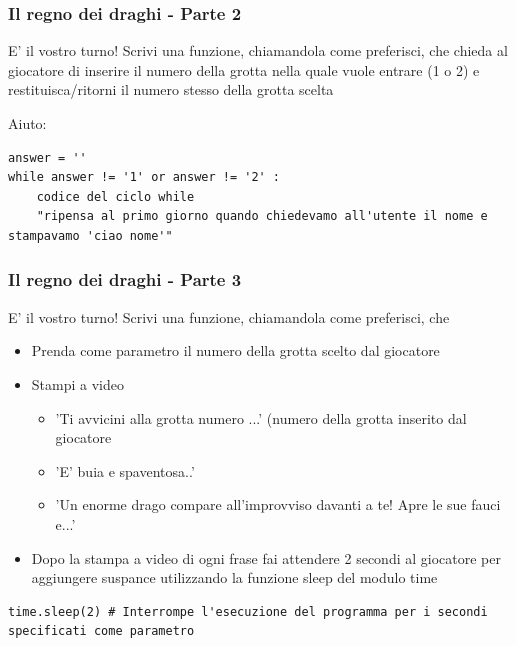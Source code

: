 \documentclass{beamer}
\begin{document}
\begin{frame}[fragile]
\frametitle{Il regno dei draghi - Parte 2}

\begin{block}{E' il vostro turno!}
Scrivi una funzione, chiamandola come preferisci, che chieda al giocatore di inserire il numero della grotta nella quale vuole entrare (1 o 2) e restituisca/ritorni il numero stesso della grotta scelta 

Aiuto:
\end{block}

    \begin{lstlisting}
answer = ''
while answer != '1' or answer != '2' :
    codice del ciclo while
    "ripensa al primo giorno quando chiedevamo all'utente il nome e stampavamo 'ciao nome'"
    \end{lstlisting}
\end{frame}

\begin{frame}[fragile]
\frametitle{Il regno dei draghi - Parte 3}

\begin{block}{E' il vostro turno!}
Scrivi una funzione, chiamandola come preferisci, che
    \begin{itemize}
        \item Prenda come parametro il numero della grotta scelto dal giocatore
        \item Stampi a video
            \begin{itemize}
                \item 'Ti avvicini alla grotta numero ...' (numero della grotta inserito dal giocatore 
                \item 'E' buia e spaventosa..'
                \item 'Un enorme drago compare all'improvviso davanti a te! Apre le sue fauci e...'
            \end{itemize}
        \item Dopo la stampa a video di ogni frase fai attendere 2 secondi al giocatore per aggiungere suspance utilizzando la funzione sleep del modulo time
    \end{itemize}
\end{block}

    \begin{lstlisting}
time.sleep(2) # Interrompe l'esecuzione del programma per i secondi specificati come parametro
    \end{lstlisting}
\end{frame}
\end{document}
